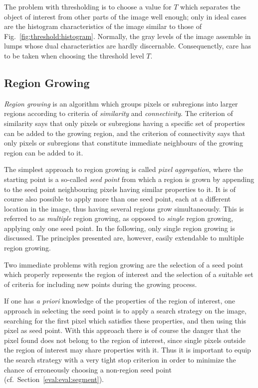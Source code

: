 The problem with thresholding is to choose a value for $T$ which
separates the object of interest from other parts of the image well
enough; only in ideal cases are the histogram characteristics of the
image similar to those of Fig.~\ref{fig:threshold:histogram}.
Normally, the gray levels of the image assemble in lumps whose dual
characteristics are hardly discernable.  Consequenctly, care has to be
taken when choosing the threshold level $T$.

\subsection{Region Growing}
\label{image:segment:region}

{\em Region growing\/} is an algorithm which groups pixels or
subregions into larger regions according to criteria of {\em
  similarity\/} and {\em connectivity\/}.  The criterion of similarity
says that only pixels or subregions having a specific set of
properties can be added to the growing region, and the criterion of
connectivity says that only pixels or subregions that constitute
immediate neighbours of the growing region can be added to it.

The simplest approach to region growing is called {\em pixel
  aggregation\/}, where the starting point is a so-called {\em seed
  point\/} from which a region is grown by appending to the seed point
neighbouring pixels having similar properties to it.  It is of course
also possible to apply more than one seed point, each at a different
location in the image, thus having several regions grow
simultaneously.  This is referred to as {\em multiple\/} region
growing, as opposed to {\em single\/} region growing, applying only
one seed point.  In the following, only single region growing is
discussed.  The principles presented are, however, easily extendable
to multiple region growing.

Two immediate problems with region growing are the selection of a seed
point which properly represents the region of interest and the
selection of a suitable set of criteria for including new points
during the growing process.

If one has {\em a priori\/} knowledge of the properties of the region
of interest, one approach in selecting the seed point is to apply a
search strategy on the image, searching for the first pixel which
satisfies these properties, and then using this pixel as seed point.
With this approach there is of course the danger that the pixel found
does not belong to the region of interest, since single pixels outside
the region of interest may share properties with it.  Thus it is
important to equip the search strategy with a very tight stop
criterion in order to minimize the chance of erroneously choosing a
non-region seed point (cf.\ Section~\ref{eval:eval:segment}).

